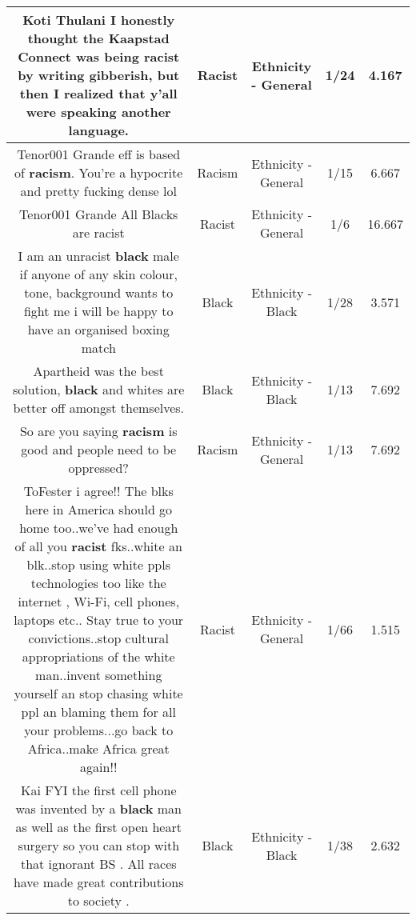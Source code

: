 \documentclass[11pt]{article}
\newlength\mylength
\begin{document}
\begin{center}
\begin{longtable}{|C{.65\mylength}|C{.30\mylength}|C{.12\mylength}|C{.12\mylength}|C{.12\mylength}|}
  \small Koti Thulani I honestly thought the Kaapstad Connect was being \textbf{racist} by writing gibberish, but then I realized that y'all were speaking another language.\normalsize   & Racist & Ethnicity - General & 1/24 & 4.167 \\  \hline
  \small Tenor001 Grande eff is based of \textbf{racism}. You're a hypocrite and pretty fucking dense lol\normalsize   & Racism & Ethnicity - General & 1/15 & 6.667 \\  \hline
  \small Tenor001 Grande All Blacks are racist\normalsize   & Racist & Ethnicity - General & 1/6 & 16.667 \\  \hline
  \small I am an unracist \textbf{black} male if anyone of any skin colour, tone, background wants to fight me i will be happy to have an organised boxing match\normalsize   & Black & Ethnicity - Black & 1/28 & 3.571 \\  \hline
  \small Apartheid was the best solution, \textbf{black} and whites are better off amongst themselves.\normalsize   & Black & Ethnicity - Black & 1/13 & 7.692 \\  \hline
  \small So are you saying \textbf{racism} is good and people need to be oppressed?\normalsize   & Racism & Ethnicity - General & 1/13 & 7.692 \\  \hline
  \small ToFester i agree!! The blks here in America should go home too..we've had enough of all you \textbf{racist} fks..white an blk..stop using white ppls technologies too like the internet , Wi-Fi, cell phones, laptops etc.. Stay true to your convictions..stop cultural appropriations of the white man..invent something yourself an stop chasing white ppl an blaming them for all your problems...go back to Africa..make Africa great again!!\normalsize   & Racist & Ethnicity - General & 1/66 & 1.515 \\  \hline
  \small Kai FYI the first cell phone was invented by a \textbf{black} man as well as the first open heart surgery so you can stop with that ignorant BS . All races have made great contributions to society .\normalsize   & Black & Ethnicity - Black & 1/38 & 2.632 \\  \hline

\end{longtable}
\end{center}
\end{document}
